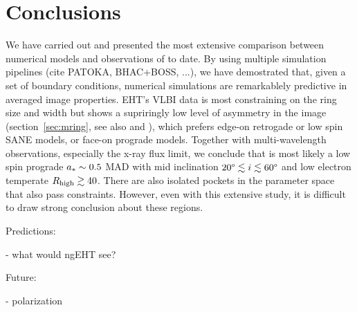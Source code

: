 \section{Conclusions}\label{sec:conclusions}


We have carried out and presented the most extensive comparison
between numerical models and observations of \sgra to date.
By using multiple simulation pipelines (cite PATOKA, BHAC+BOSS, ...),
we have demostrated that, given a set of boundary conditions,
numerical simulations are remarkablely predictive in averaged image
properties.
EHT's VLBI data is most constraining on the ring size and width but
shows a supriringly low level of asymmetry in the image
(section~\ref{sec:mring}, see also \citealt{PaperIII} and
\citealt{PaperIV}), which prefers edge-on retrogade or low spin
SANE models, or face-on prograde models.
Together with multi-wavelength observations, especially the x-ray flux
limit, we conclude that \sgra is most likely a low spin prograde $a_*
\sim 0.5$ MAD with mid inclination $20\degree \lesssim i \lesssim
60\degree$ and low electron temperate $R_\mathrm{high} \gtrsim 40$.
There are also isolated pockets in the parameter space that also pass
constraints.
However, even with this extensive study, it is difficult to draw
strong conclusion about these regions.

Predictions:

- what would ngEHT see?

Future:

- polarization
